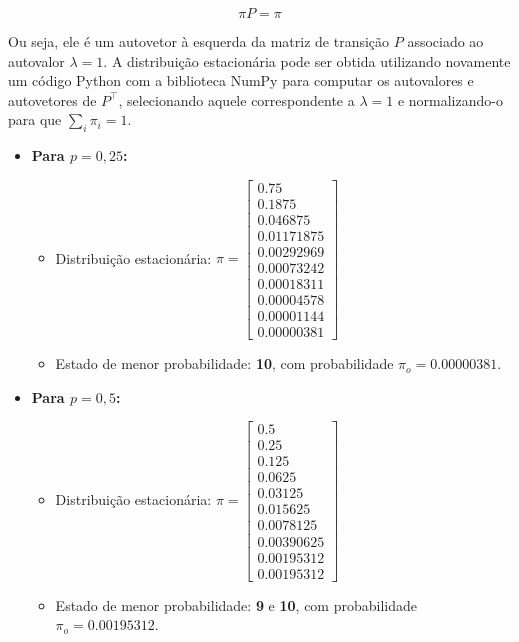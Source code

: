 \begin{enumerate}
\begin{resposta}
        $$ \pi P = \pi $$

        Ou seja, ele é um autovetor à esquerda da matriz de transição $P$ associado ao autovalor $\lambda = 1$. 
        A distribuição estacionária pode ser obtida utilizando novamente um código Python com a biblioteca NumPy para computar os autovalores e autovetores de $P^\top$, selecionando aquele correspondente a $\lambda = 1$ e normalizando-o para que $\sum_i \pi_i = 1$.

        \newpage
        \begin{itemize}
            \item \textbf{Para $p = 0{,}25$:}
            \begin{itemize}
                \item Distribuição estacionária:
                $
                \pi = 
                \begin{bmatrix}
                0.75 \\
                0.1875 \\
                0.046875 \\
                0.01171875 \\
                0.00292969 \\
                0.00073242 \\
                0.00018311 \\
                0.00004578 \\
                0.00001144 \\
                \boxed{0.00000381}
                \end{bmatrix}
                $
                \item Estado de menor probabilidade: \textbf{10}, com probabilidade $\boxed{\pi_o = 0.00000381}$.
            \end{itemize}

            \newpage
            \item \textbf{Para $p = 0{,}5$:}
            \begin{itemize}
                \item Distribuição estacionária:
                $
                \pi = 
                \begin{bmatrix}
                0.5 \\
                0.25 \\
                0.125 \\
                0.0625 \\
                0.03125 \\
                0.015625 \\
                0.0078125 \\
                0.00390625 \\
                \boxed{0.00195312} \\
                \boxed{0.00195312}
                \end{bmatrix}
                $
                \item Estado de menor probabilidade: \textbf{9} e \textbf{10}, com probabilidade $\boxed{\pi_o = 0.00195312}$.
            \end{itemize}


\end{itemize}
\end{resposta}
\end{enumerate}
